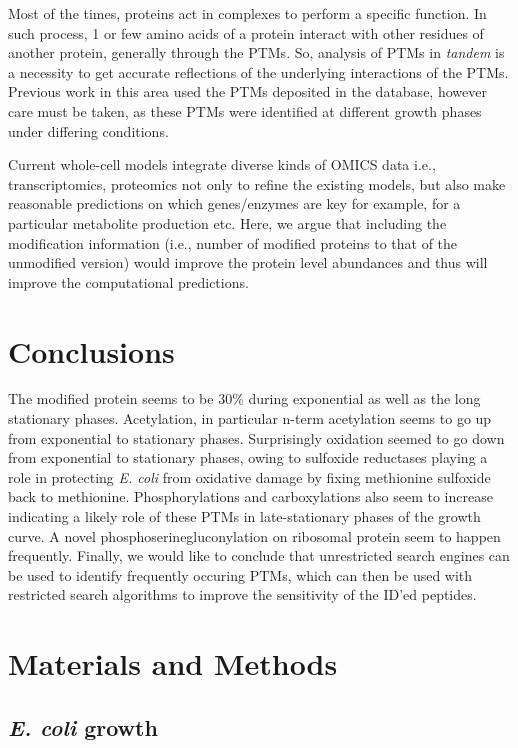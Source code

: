 \documentclass[12pt]{article}
\begin{document}
Most of the times, proteins act in complexes to perform a specific function. In such process, 1 or few amino acids of a protein interact with other residues of another protein, generally through the PTMs. So, analysis of PTMs in \emph{tandem} is a necessity to get accurate reflections of the underlying interactions of the PTMs. Previous work in this area used the PTMs deposited in the database, however care must be taken, as these PTMs were identified at different growth phases under differing conditions.

Current whole-cell models \cite{Covertetal2008} integrate diverse kinds of OMICS data i.e., transcriptomics, proteomics not only to refine the existing models, but also make reasonable predictions on which genes/enzymes are key for example, for a particular metabolite production etc. Here, we argue that including the modification information (i.e., number of modified proteins to that of the unmodified version) would improve the protein level abundances and thus will improve the computational predictions.

\section{Conclusions}

The modified protein seems to be 30\% during exponential as well as the long stationary phases. Acetylation, in particular n-term acetylation seems to go up from exponential to stationary phases. Surprisingly oxidation seemed to go down from exponential to stationary phases, owing to sulfoxide reductases playing a role in protecting \emph{E. coli} from oxidative damage by fixing methionine sulfoxide back to methionine. Phosphorylations and carboxylations also seem to increase indicating a likely role of these PTMs in late-stationary phases of the growth curve. A novel phosphoserinegluconylation on ribosomal protein seem to happen frequently. Finally, we would like to conclude that unrestricted search engines can be used to identify frequently occuring PTMs, which can then be used with restricted search algorithms to improve the sensitivity of the ID'ed peptides.


\section{Materials and Methods}

\subsection{\emph{E. coli} growth} 
\end{document}

